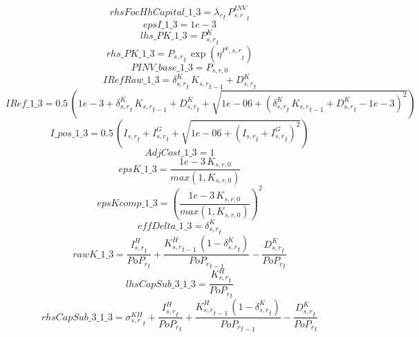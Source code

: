 \begin{dmath*}
rhsFocHhCapital\_1\_3 = {\lambda_r}_{t}\, {{P^{INV}_{s,r}}}_{t}
\end{dmath*}
\begin{dmath*}
epsI\_1\_3 = 1e-3
\end{dmath*}
\begin{dmath*}
lhs\_PK\_1\_3 = {{P^K_{s,r}}}_{t}
\end{dmath*}
\begin{dmath*}
rhs\_PK\_1\_3 = {{P_{s,r}}}_{t}\, \exp\left({{\eta^{P^k,s,r}}}_{t}\right)
\end{dmath*}
\begin{dmath*}
PINV\_base\_1\_3 = {{P_{s,r,0}}}
\end{dmath*}
\begin{dmath*}
IRefRaw\_1\_3 = {{\delta^{K}_{s,r}}}_{t}\, {{K_{s,r}}}_{t-1}+{{D^K_{s,r}}}_{t}
\end{dmath*}
\begin{dmath*}
IRef\_1\_3 = 0.5\, \left(1e-3+{{\delta^{K}_{s,r}}}_{t}\, {{K_{s,r}}}_{t-1}+{{D^K_{s,r}}}_{t}+\sqrt{1e-06+\left({{\delta^{K}_{s,r}}}_{t}\, {{K_{s,r}}}_{t-1}+{{D^K_{s,r}}}_{t}-1e-3\right)^{2}}\right)
\end{dmath*}
\begin{dmath*}
I\_pos\_1\_3 = 0.5\, \left({{I_{s,r}}}_{t}+{{I^G_{s,r}}}_{t}+\sqrt{1e-06+\left({{I_{s,r}}}_{t}+{{I^G_{s,r}}}_{t}\right)^{2}}\right)
\end{dmath*}
\begin{dmath*}
AdjCost\_1\_3 = 1
\end{dmath*}
\begin{dmath*}
epsK\_1\_3 = \frac{1e-3\, {{K_{s,r,0}}}}{max(1,{{K_{s,r,0}}})}
\end{dmath*}
\begin{dmath*}
epsKcomp\_1\_3 = \left(\frac{1e-3\, {{K_{s,r,0}}}}{max(1,{{K_{s,r,0}}})}\right)^{2}
\end{dmath*}
\begin{dmath*}
effDelta\_1\_3 = {{\delta^{K}_{s,r}}}_{t}
\end{dmath*}
\begin{dmath*}
rawK\_1\_3 = \frac{{{I^H_{s,r}}}_{t}}{{{PoP_r}}_{t}}+\frac{{{K^H_{s,r}}}_{t-1}\, \left(1-{{\delta^{K}_{s,r}}}_{t}\right)}{{{PoP_r}}_{t-1}}-\frac{{{D^K_{s,r}}}_{t}}{{{PoP_r}}_{t}}
\end{dmath*}
\begin{dmath*}
lhsCapSub\_3\_1\_3 = \frac{{{K^H_{s,r}}}_{t}}{{{PoP_r}}_{t}}
\end{dmath*}
\begin{dmath*}
rhsCapSub\_3\_1\_3 = {{\sigma^{KH}_{s,r}}}_{t}+\frac{{{I^H_{s,r}}}_{t}}{{{PoP_r}}_{t}}+\frac{{{K^H_{s,r}}}_{t-1}\, \left(1-{{\delta^{K}_{s,r}}}_{t}\right)}{{{PoP_r}}_{t-1}}-\frac{{{D^K_{s,r}}}_{t}}{{{PoP_r}}_{t}}
\end{dmath*}
